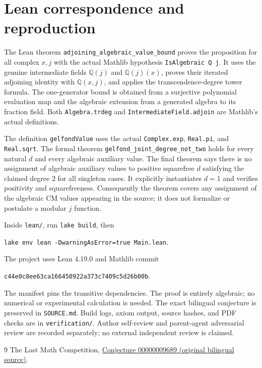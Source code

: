 \documentclass[11pt]{article}
\begin{document}
\section*{Lean correspondence and reproduction}
The Lean theorem \texttt{adjoining\_algebraic\_value\_bound} proves the proposition for all complex $x,j$ with the actual Mathlib hypothesis \texttt{IsAlgebraic Q j}. It uses the genuine intermediate fields $\mathbb Q(j)$ and $\mathbb Q(j)(x)$, proves their iterated adjoining identity with $\mathbb Q(x,j)$, and applies the transcendence-degree tower formula. The one-generator bound is obtained from a surjective polynomial evaluation map and the algebraic extension from a generated algebra to its fraction field. Both \texttt{Algebra.trdeg} and \texttt{IntermediateField.adjoin} are Mathlib's actual definitions.

The definition \texttt{gelfondValue} uses the actual \texttt{Complex.exp}, \texttt{Real.pi}, and \texttt{Real.sqrt}. The formal theorem \texttt{gelfond\_joint\_degree\_not\_two} holds for every natural $d$ and every algebraic auxiliary value. The final theorem says there is no assignment of algebraic auxiliary values to positive squarefree $d$ satisfying the claimed degree $2$ for all singleton cases. It explicitly instantiates $d=1$ and verifies positivity and squarefreeness. Consequently the theorem covers any assignment of the algebraic CM values appearing in the source; it does not formalize or postulate a modular $j$ function.

Inside \texttt{lean/}, run \texttt{lake build}, then
\begin{center}\texttt{lake env lean -DwarningAsError=true Main.lean}.\end{center}
The project uses Lean 4.19.0 and Mathlib commit
\begin{center}\small\texttt{c44e0c8ee63ca166450922a373c7409c5d26b00b}.\end{center}
The manifest pins the transitive dependencies. The proof is entirely algebraic; no numerical or experimental calculation is needed. The exact bilingual conjecture is preserved in \texttt{SOURCE.md}. Build logs, axiom output, source hashes, and PDF checks are in \texttt{verification/}. Author self-review and parent-agent adversarial review are recorded separately; no external independent review is claimed.

\begin{thebibliography}{9}
 The Last Math Competition,
\href{https://github.com/The-Last-Math-Competition/The-Last-Math-Competition/blob/main/conjectures/00000009689.md}{Conjecture 00000009689 (original bilingual source)}.
\end{thebibliography}
\end{document}
